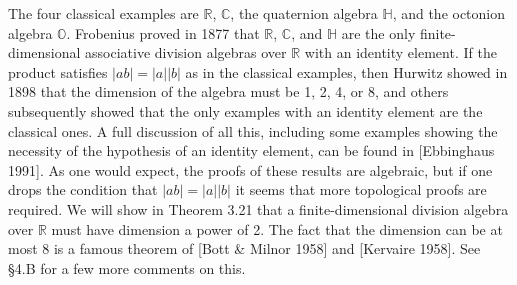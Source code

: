 The four classical examples are $\mathbb{R}$, $\mathbb{C}$, the quaternion algebra $\mathbb{H}$, and the octonion algebra $\mathbb{O}$. Frobenius proved in 1877 that $\mathbb{R}$, $\mathbb{C}$, and $\mathbb{H}$ are the only finite-dimensional associative division algebras over $\mathbb{R}$ with an identity element. If the product satisfies $|ab| = |a||b|$ as in the classical examples, then Hurwitz showed in 1898 that the dimension of the algebra must be 1, 2, 4, or 8, and others subsequently showed that the only examples with an identity element are the classical ones. A full discussion of all this, including some examples showing the necessity of the hypothesis of an identity element, can be found in [Ebbinghaus 1991]. As one would expect, the proofs of these results are algebraic, but if one drops the condition that $|ab| = |a||b|$ it seems that more topological proofs are required. We will show in Theorem 3.21 that a finite-dimensional division algebra over $\mathbb{R}$ must have dimension a power of 2. The fact that the dimension can be at most 8 is a famous theorem of [Bott \& Milnor 1958] and [Kervaire 1958]. See \S 4.B for a few more comments on this.
